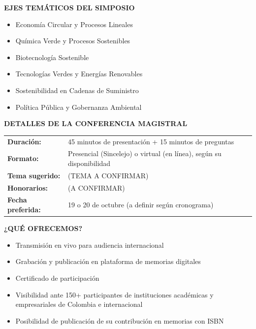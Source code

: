 \documentclass[12pt,a4paper]{article}
\begin{document}
\vspace{0.5cm}

\noindent
\textbf{EJES TEMÁTICOS DEL SIMPOSIO}

\begin{itemize}
  \item Economía Circular y Procesos Lineales
  \item Química Verde y Procesos Sostenibles
  \item Biotecnología Sostenible
  \item Tecnologías Verdes y Energías Renovables
  \item Sostenibilidad en Cadenas de Suministro
  \item Política Pública y Gobernanza Ambiental
\end{itemize}

\vspace{0.5cm}

\noindent
\textbf{DETALLES DE LA CONFERENCIA MAGISTRAL}

\begin{tabular}{ll}
\textbf{Duración:} & 45 minutos de presentación + 15 minutos de preguntas \\
\textbf{Formato:} & Presencial (Sincelejo) o virtual (en línea), según su disponibilidad \\
\textbf{Tema sugerido:} & (TEMA A CONFIRMAR) \\
\textbf{Honorarios:} & (A CONFIRMAR) \\
\textbf{Fecha preferida:} & 19 o 20 de octubre (a definir según cronograma) \\
\end{tabular}

\vspace{0.5cm}

\noindent
\textbf{¿QUÉ OFRECEMOS?}

\begin{itemize}
  \item Transmisión en vivo para audiencia internacional
  \item Grabación y publicación en plataforma de memorias digitales
  \item Certificado de participación
  \item Visibilidad ante 150+ participantes de instituciones académicas y empresariales de Colombia e internacional
  \item Posibilidad de publicación de su contribución en memorias con ISBN
\end{itemize}
\end{document}
